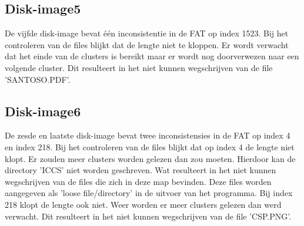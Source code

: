\documentclass[11pt]{article}
\begin{document}
	\subsection{Disk-image5}\label{sec:disk5}
	De vijfde disk-image bevat \'e\'en inconsistentie in de FAT op index 1523. Bij het controleren van de files blijkt dat de lengte niet te kloppen. Er wordt verwacht dat het einde van de clusters is bereikt maar er wordt nog doorverwezen naar een volgende cluster. Dit resulteert in het niet kunnen wegschrijven van de file 'SANTOSO.PDF'.

	\subsection{Disk-image6}\label{sec:disk6}
	De zesde en laatste disk-image bevat twee inconsistensies in de FAT op index 4 en index 218. Bij het controleren van de files blijkt dat op index 4 de lengte niet klopt. Er zouden meer clusters worden gelezen dan zou moeten. Hierdoor kan de directory 'ICCS' niet worden geschreven. Wat resulteert in het niet kunnen wegschrijven van de files die zich in deze map bevinden. Deze files worden aangegeven als 'loose file/directory' in de uitvoer van het programma. Bij index 218 klopt de lengte ook niet. Weer worden er meer clusters gelezen dan werd verwacht. Dit resulteert in het niet kunnen wegschrijven van de file 'CSP.PNG'.
\end{document}
